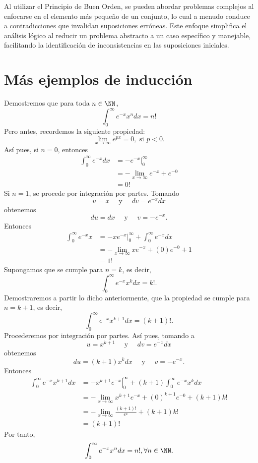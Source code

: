 Al utilizar el Principio de Buen Orden, se pueden abordar problemas complejos al enfocarse en el elemento más pequeño de un conjunto, lo cual a menudo conduce a contradicciones que invalidan suposiciones erróneas. Este enfoque simplifica el análisis lógico al reducir un problema abstracto a un caso específico y manejable, facilitando la identificación de inconsistencias en las suposiciones iniciales.

\newpage

\section{Más ejemplos de inducción}
\vspace{-0.15cm}
\begin{examplebox}{}{}
    Demostremos que para toda $n \in \NN$,
    $$\int_{0}^{\infty} e^{-x}x^{n} dx=n!$$
    Pero antes, recordemos la siguiente propiedad:
    $$\lim_{x \to \infty} e^{px}=0, \text{ si } p<0.$$
    Así pues, si $n = 0$, entonces
    \begin{align*}
        \int_{0}^{\infty} e^{-x} dx & = \left. -e^{-x} \right|_{0}^{\infty} \\
        & = - \lim_{x \rightarrow \infty} e^{-x} + e^{-0} \\
        & = 0!
    \end{align*}
    Si $n = 1$, se procede por integración por partes. Tomando
    $$u = x \quad \text{ y } \quad dv = e^{-x} dx$$
    obtenemos
    $$du = dx \quad \text{ y } \quad v = -e^{-x}.$$
    Entonces
    \begin{align*}
        \int_0^{\infty} e^{-x}x & = \left. -xe^{-x} \right|_{0}^{\infty} + \int_0^{\infty} e^{-x} dx \\
        & = - \lim_{x \to \infty} xe^{-x} + (0)e^{-0} + 1 \\
        & = 1!
    \end{align*}
    Supongamos que se cumple para $n=k$, es decir,
    $$\int_{0}^{\infty} e^{-x}x^{k} dx = k!.$$
    Demostraremos a partir lo dicho anteriormente, que la propiedad se cumple para $n=k+1$, es decir,
    $$\int_{0}^{\infty} e^{-x}x^{k+1} dx = (k + 1)!.$$
    Procederemos por integración por partes. Así pues, tomando a
    $$u = x^{k+1} \quad \text{ y } \quad dv = e^{-x} dx$$
    obtenemos
    $$du = (k+1)x^k dx \quad \text{ y } \quad v = -e^{-x}.$$
    Entonces
    \begin{align*}
        \int_{0}^{\infty} e^{-x}x^{k+1} dx &= \left. -x^{k+1}e^{-x} \right|_{0}^{\infty} + (k+1) \int_{0}^{\infty} e^{-x} x^k dx \\
        & = - \lim_{x \rightarrow \infty} x^{k+1}e^{-x}+(0)^{k+1}e^{-0}+(k+1)k! \\
        & = - \lim_{x \rightarrow \infty} \frac{(k+1)!}{e^x} +(k+1)k! \\
        & = (k + 1)!
    \end{align*}
    Por tanto,
    $$\int_{0}^{\infty} e^{-x}x^{n} dx = n!, \forall n \in \NN.$$
\end{examplebox}

